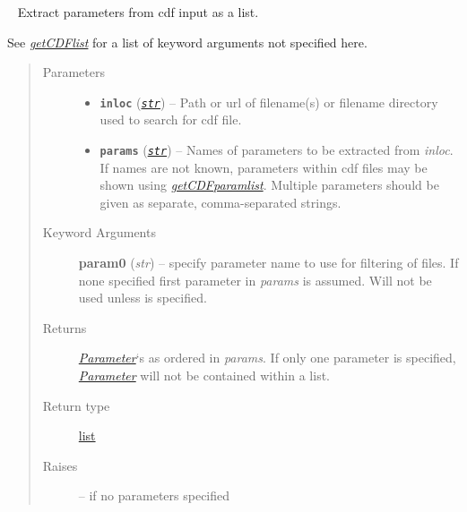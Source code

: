 \documentclass[letterpaper,10pt,english]{sphinxhowto}
\begin{document}
\begin{fulllineitems}
\label{swtools_doc:swtools.getCDFparams}~\label{swtools_doc:getcdfparams}
Extract parameters from cdf input as a list.

See {\hyperref[swtools_doc:getcdflist]{\emph{getCDFlist}}} for a list of keyword arguments not specified here.
\begin{quote}\begin{description}
\item[{Parameters}] \leavevmode\begin{itemize}
\item {} 
\textbf{\texttt{inloc}} (\href{https://docs.python.org/library/functions.html\#str}{\emph{\texttt{str}}}) -- Path or url of filename(s) or filename directory used to search for
cdf file.

\item {} 
\textbf{\texttt{params}} (\href{https://docs.python.org/library/functions.html\#str}{\emph{\texttt{str}}}) -- Names of parameters to be extracted from \emph{inloc}. If names are not
known, parameters within cdf files may be shown using
{\hyperref[swtools_doc:getcdfparamlist]{\emph{getCDFparamlist}}}. Multiple parameters should be given as
separate, comma-separated strings.

\end{itemize}

\item[{Keyword Arguments}] \leavevmode
\textbf{param0} (\emph{str}) --
specify parameter name to use for filtering of files. If none
specified first parameter in \emph{params} is assumed. Will not be
used unless  is specified.

\item[{Returns}] \leavevmode
{\hyperref[swtools_doc:parameter]{\emph{Parameter}}}`s as ordered in \emph{params}. If only one parameter is
specified, {\hyperref[swtools_doc:parameter]{\emph{Parameter}}} will not be contained within a list.

\item[{Return type}] \leavevmode
\href{https://docs.python.org/library/functions.html\#list}{list}

\item[{Raises}] \leavevmode
{} --
if no parameters specified

\end{description}\end{quote}

\end{fulllineitems}
\end{document}
